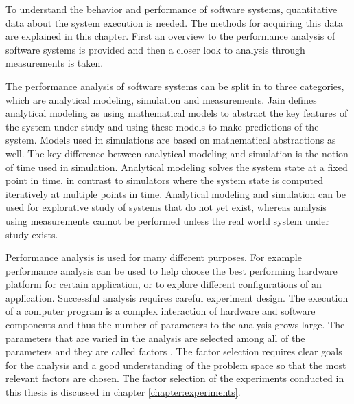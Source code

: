 To understand the behavior and performance of software systems, quantitative data about the system execution is needed. The methods for acquiring this data are explained in this chapter. First an overview to the performance analysis of software systems is provided and then a closer look to analysis through measurements is taken.

The performance analysis of software systems can be split in to three categories, which are analytical modeling, simulation and measurements. Jain \cite{jain1991art} defines analytical modeling as using mathematical models to abstract the key features of the system under study and using these models to make predictions of the system. Models used in simulations are based on mathematical abstractions as well. The key difference between analytical modeling and simulation is the notion of time used in simulation. Analytical modeling solves the system state at a fixed point in time, in contrast to simulators where the system state is computed iteratively at multiple points in time. Analytical modeling and simulation can be used for explorative study of systems that do not yet exist, whereas analysis using measurements cannot be performed unless the real world system under study exists. \cite{jain1991art}


Performance analysis is used for many different purposes. For example performance analysis can be used to help choose the best performing hardware platform for certain application, or to explore different configurations of an application. Successful analysis requires careful experiment design. The execution of a computer program is a complex interaction of hardware and software components and thus the number of parameters to the analysis grows large. The parameters that are varied in the analysis are selected among all of the parameters and they are called factors \cite{jain1991art}. The factor selection requires clear goals for the analysis and a good understanding of the problem space so that the most relevant factors are chosen. The factor selection of the experiments conducted in this thesis is discussed in chapter \ref{chapter:experiments}.
